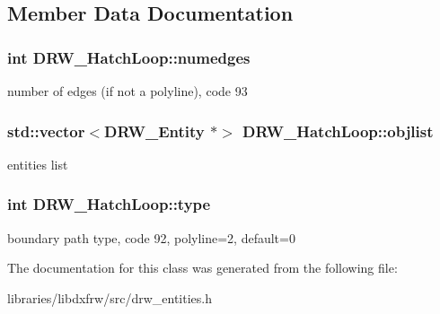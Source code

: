 \subsection{Member Data Documentation}
\hypertarget{classDRW__HatchLoop_a48586ffbf48389a849e47c7d2412a280}{
\subsubsection[{numedges}]{\setlength{\rightskip}{0pt plus 5cm}int D\-R\-W\-\_\-\-Hatch\-Loop\-::numedges}}\label{classDRW__HatchLoop_a48586ffbf48389a849e47c7d2412a280}
number of edges (if not a polyline), code 93 \hypertarget{classDRW__HatchLoop_afbd7d0876386234348fa0a301051d601}{
\subsubsection[{objlist}]{\setlength{\rightskip}{0pt plus 5cm}std\-::vector$<${\bf D\-R\-W\-\_\-\-Entity} $\ast$$>$ D\-R\-W\-\_\-\-Hatch\-Loop\-::objlist}}\label{classDRW__HatchLoop_afbd7d0876386234348fa0a301051d601}
entities list \hypertarget{classDRW__HatchLoop_a5891fcfa111b70221bc04c629bd6286d}{
\subsubsection[{type}]{\setlength{\rightskip}{0pt plus 5cm}int D\-R\-W\-\_\-\-Hatch\-Loop\-::type}}\label{classDRW__HatchLoop_a5891fcfa111b70221bc04c629bd6286d}
boundary path type, code 92, polyline=2, default=0 

The documentation for this class was generated from the following file\-:\begin{DoxyCompactItemize}
\item 
libraries/libdxfrw/src/drw\-\_\-entities.\-h\end{DoxyCompactItemize}
